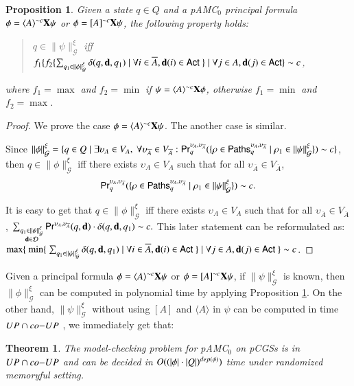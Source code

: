 \documentclass[letterpaper]{article}
\newcommand{\calM}{\mathcal{G}}
\newcommand{\calD}{\mathcal{D}}
\newcommand{\calP}{{\sf Paths}}
\newcommand{\Act}{\textsf{Act}}
\newcommand{\Prb}{\textsf{Pr}}
\newcommand{\nA}{\overline{A}}
\newcommand{\dec}{{\bf d}}
\newcommand{\pamcs}{{pAMC$_0$}\xspace}
\newcommand{\opX}{{\bf X}}
\newcommand{\opA}[1]{\langle{#1}\rangle}
\newcommand{\opUA}[1]{[{#1}]}
\newcommand {\semantics}[1]{\|{#1}\|}  %
\newtheorem{theorem}{Theorem}
\newtheorem{proposition}{Proposition}
\begin{document}
\begin{proposition}\label{prop-optimal} Given a state $q\in Q$ and a \pamcs principal formula $\phi=\opA{A}^{\sim c}\opX\psi$ or $\phi=\opUA{A}^{\sim c}\opX\psi$, the following property holds:

\begin{quote}
$q\in \semantics{\psi}_\calM^\xi$ iff $f_1\{f_2\{\sum_{q_1\in \semantics{\phi}_\calM^\xi} \delta(q,\dec,q_1)\mid \forall i\in \nA, \dec(i)\in \Act \ \} \mid \forall j\in A,\dec(j)\in\Act\}\sim c$,
\end{quote}
where $f_1=\max$ and $f_2=\min$ if $\psi=\opA{A}^{\sim c}\opX\phi$, otherwise $f_1=\min$ and $f_2=\max$.
\end{proposition}
\begin{proof}
We prove the case $\phi=\opA{A}^{\sim c}\opX\psi$. The another case is similar.


Since $\semantics{\phi}_\calM^\xi=\{q\in Q\mid \exists \upsilon_A\in V_A, \ \forall \upsilon_{\nA}\in V_{\nA}: \Prb_q^{\upsilon_A,\upsilon_{\nA}}(\{\rho\in \calP_q^{\upsilon_A,\upsilon_{\nA}}\mid \rho_1\in\semantics{\psi}_\calM^\xi\})\sim c\}$, then $q\in \semantics{\phi}_\calM^\xi$
iff there exists $\upsilon_A\in V_A$ such that for all $\upsilon_{\nA}\in V_{\nA}$,
\[\Prb_q^{\upsilon_A,\upsilon_{\nA}}(\{\rho\in \calP_q^{\upsilon_A,\upsilon_{\nA}}\mid \rho_1\in\semantics{\psi}_\calM^\xi\})\sim c.\]


It is easy to get that $q\in \semantics{\phi}_\calM^\xi$
iff there exists $\upsilon_A\in V_A$ such that for all $\upsilon_{\nA}\in V_{\nA}$,
$\sum_{\substack{q_1\in \semantics{\psi}_\calM^\xi \\ \dec\in\calD}} \Prb^{\upsilon_A,\upsilon_{\nA}}(q,\dec)\cdot\delta(q,\dec,q_1) \sim c.$
This later statement can be reformulated as:
$\max\{\ \min\{ \ \sum_{q_1\in \semantics{\psi}_\calM^\xi}\delta(q,\dec,q_1) \mid \forall i\in \nA, \dec(i)\in\Act \ \}\mid \forall j\in A, \dec(j)\in\Act \  \}\sim c$.
\end{proof}

Given a principal formula $\phi=\opA{A}^{\sim c}\opX\psi$ or $\phi=\opUA{A}^{\sim c}\opX\psi$,
if $\semantics{\psi}_\calM^\xi$ is known, then $\semantics{\phi}_\calM^\xi$ can be computed in polynomial time by applying Proposition \ref{prop-optimal}.
On the other hand, $\semantics{\psi}_\calM^\xi$ without using $\opUA{A}$ and $\opA{A}$ in $\psi$ can be computed in time ${\sc UP\cap co{-}UP}$ \cite{LSWZ15}, we immediately get that:

\begin{theorem}
The model-checking problem for \pamcs on pCGSs is in ${\sc UP\cap co{-}UP}$ and can be decided in ${\sc O}((|\phi|\cdot |Q|)^{dep(\phi)})$ time under
randomized memoryful setting.
\end{theorem}
\end{document}

